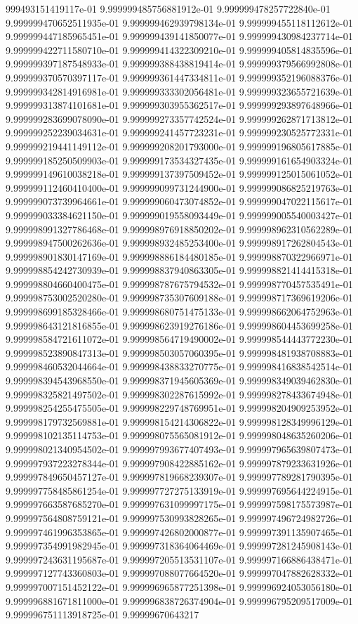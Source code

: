 999493151419117e-01	9.999999485756881912e-01	9.999999478257722840e-01	9.999999470652511935e-01	9.999999462939798134e-01	9.999999455118112612e-01	9.999999447185965451e-01	9.999999439141850077e-01	9.999999430984237714e-01	9.999999422711580710e-01	9.999999414322309210e-01	9.999999405814835596e-01	9.999999397187548933e-01	9.999999388438819414e-01	9.999999379566992808e-01	9.999999370570397117e-01	9.999999361447334811e-01	9.999999352196088376e-01	9.999999342814916981e-01	9.999999333302056481e-01	9.999999323655721639e-01	9.999999313874101681e-01	9.999999303955362517e-01	9.999999293897648966e-01	9.999999283699078090e-01	9.999999273357742524e-01	9.999999262871713812e-01	9.999999252239034631e-01	9.999999241457723231e-01	9.999999230525772331e-01	9.999999219441149112e-01	9.999999208201793000e-01	9.999999196805617885e-01	9.999999185250509903e-01	9.999999173534327435e-01	9.999999161654903324e-01	9.999999149610038218e-01	9.999999137397509452e-01	9.999999125015061052e-01	9.999999112460410400e-01	9.999999099731244900e-01	9.999999086825219763e-01	9.999999073739964661e-01	9.999999060473074852e-01	9.999999047022115617e-01	9.999999033384621150e-01	9.999999019558093449e-01	9.999999005540003427e-01	9.999998991327786468e-01	9.999998976918850202e-01	9.999998962310562289e-01	9.999998947500262636e-01	9.999998932485253400e-01	9.999998917262804543e-01	9.999998901830147169e-01	9.999998886184480185e-01	9.999998870322966971e-01	9.999998854242730939e-01	9.999998837940863305e-01	9.999998821414415318e-01	9.999998804660400475e-01	9.999998787675794532e-01	9.999998770457535491e-01	9.999998753002520280e-01	9.999998735307609188e-01	9.999998717369619206e-01	9.999998699185328466e-01	9.999998680751475133e-01	9.999998662064752963e-01	9.999998643121816855e-01	9.999998623919276186e-01	9.999998604453699258e-01	9.999998584721611072e-01	9.999998564719490002e-01	9.999998544443772230e-01	9.999998523890847313e-01	9.999998503057060395e-01	9.999998481938708883e-01	9.999998460532044664e-01	9.999998438833270775e-01	9.999998416838542514e-01	9.999998394543968550e-01	9.999998371945605369e-01	9.999998349039462830e-01	9.999998325821497502e-01	9.999998302287615992e-01	9.999998278433674948e-01	9.999998254255475505e-01	9.999998229748769951e-01	9.999998204909253952e-01	9.999998179732569881e-01	9.999998154214306822e-01	9.999998128349996129e-01	9.999998102135114753e-01	9.999998075565081912e-01	9.999998048635260206e-01	9.999998021340954502e-01	9.999997993677407493e-01	9.999997965639807473e-01	9.999997937223278344e-01	9.999997908422885162e-01	9.999997879233631926e-01	9.999997849650457127e-01	9.999997819668239307e-01	9.999997789281790395e-01	9.999997758485861254e-01	9.999997727275133919e-01	9.999997695644224915e-01	9.999997663587685270e-01	9.999997631099997175e-01	9.999997598175573987e-01	9.999997564808759121e-01	9.999997530993828265e-01	9.999997496724982726e-01	9.999997461996353865e-01	9.999997426802000877e-01	9.999997391135907465e-01	9.999997354991982945e-01	9.999997318364064469e-01	9.999997281245908143e-01	9.999997243631195687e-01	9.999997205513531107e-01	9.999997166886438471e-01	9.999997127743360803e-01	9.999997088077664520e-01	9.999997047882628332e-01	9.999997007151452122e-01	9.999996965877251398e-01	9.999996924053056180e-01	9.999996881671811000e-01	9.999996838726374904e-01	9.999996795209517009e-01	9.999996751113918725e-01	9.99999670643217